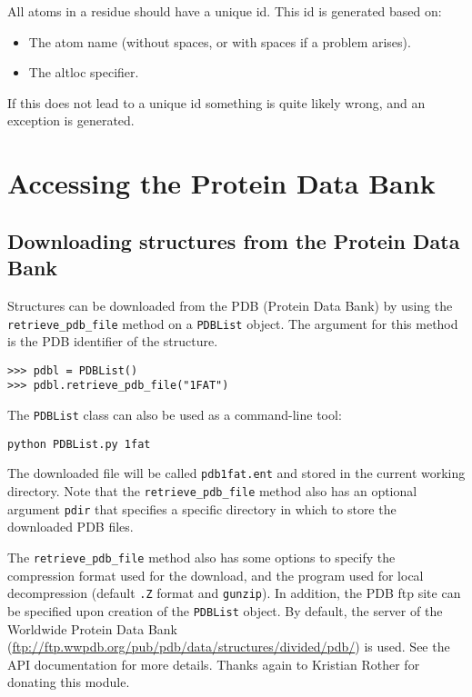All atoms in a residue should have a unique id. This id is generated based on:

\begin{itemize}
\item The atom name (without spaces, or with spaces if a problem arises).
\item The altloc specifier.
\end{itemize}
If this does not lead to a unique id something is quite likely wrong, and an
exception is generated.

\section{Accessing the Protein Data Bank}

\subsection{Downloading structures from the Protein Data Bank}

Structures can be downloaded from the PDB (Protein Data Bank)
by using the \texttt{retrieve\_pdb\_file} method on a \texttt{PDBList} object.
The argument for this method is the PDB identifier of the structure.

\begin{verbatim}
>>> pdbl = PDBList()
>>> pdbl.retrieve_pdb_file("1FAT")
\end{verbatim}

The \texttt{PDBList} class can also be used as a command-line tool:
\begin{verbatim}
python PDBList.py 1fat
\end{verbatim}
The downloaded file will be called \texttt{pdb1fat.ent} and stored
in the current working directory. Note that the \texttt{retrieve\_pdb\_file}
method also has an optional argument \texttt{pdir} that specifies
a specific directory in which to store the downloaded PDB files.

The \texttt{retrieve\_pdb\_file} method also has some options to specify
the compression format used for the download, and the program used
for local decompression (default \texttt{.Z} format and \texttt{gunzip}).
In addition, the PDB ftp site can be specified upon creation of the
\texttt{PDBList} object. By default, the server of the Worldwide Protein Data Bank (\url{ftp://ftp.wwpdb.org/pub/pdb/data/structures/divided/pdb/})
is used. See the API documentation for more details. Thanks again
to Kristian Rother for donating this module.

